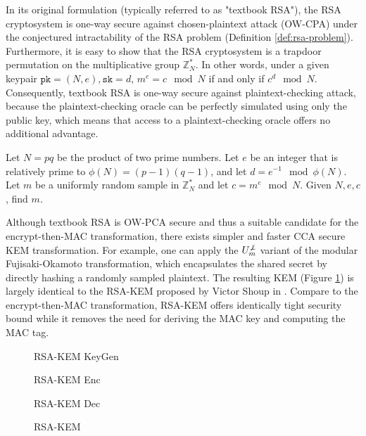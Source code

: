 \documentclass[runningheads]{llncs}
\begin{document}
In its original formulation (typically referred to as "textbook RSA"), the RSA cryptosystem is one-way secure against chosen-plaintext attack (OW-CPA) under the conjectured intractability of the RSA problem \cite{DBLP:journals/cacm/RivestSA78} (Definition \ref{def:rsa-problem}). Furthermore, it is easy to show that the RSA cryptosystem is a trapdoor permutation on the multiplicative group $\mathbb{Z}_N^\ast$. In other words, under a given keypair $\texttt{pk} = (N, e), \texttt{sk} = d$, $m^e = c \mod N$ if and only if $c^d \mod N$. Consequently, textbook RSA is one-way secure against plaintext-checking attack, because the plaintext-checking oracle can be perfectly simulated using only the public key, which means that access to a plaintext-checking oracle offers no additional advantage.

\begin{definition}\label{def:rsa-problem}
   Let $N = pq$ be the product of two prime numbers. Let $e$ be an integer that is relatively prime to $\phi(N) = (p - 1)(q - 1)$, and let $d = e^{-1} \mod \phi(N)$. Let $m$ be a uniformly random sample in $\mathbb{Z}_N^\ast$ and let $c = m^e \mod N$. Given $N, e, c$, find $m$.
\end{definition}

Although textbook RSA is OW-PCA secure and thus a suitable candidate for the encrypt-then-MAC transformation, there exists simpler and faster CCA secure KEM transformation. For example, one can apply the $U^{\not\bot}_m$ variant of the modular Fujisaki-Okamoto transformation, which encapsulates the shared secret by directly hashing a randomly sampled plaintext. The resulting KEM (Figure \ref{fig:rsa-kem}) is largely identical to the RSA-KEM proposed by Victor Shoup in \cite{DBLP:journals/iacr/Shoup01}. Compare to the encrypt-then-MAC transformation, RSA-KEM offers identically tight security bound while it removes the need for deriving the MAC key and computing the MAC tag.

\begin{figure}[H]
    \centering
    \begin{minipage}[t]{0.3\textwidth}
        \begin{algorithm}[H]
            \caption*{RSA-KEM KeyGen}
        \end{algorithm}
    \end{minipage}
    \begin{minipage}[t]{0.3\textwidth}
        \begin{algorithm}[H]
            \caption*{RSA-KEM Enc}
        \end{algorithm}
    \end{minipage}
    \begin{minipage}[t]{0.3\textwidth}
        \begin{algorithm}[H]
            \caption*{RSA-KEM Dec}
        \end{algorithm}
    \end{minipage}
    \caption{RSA-KEM}\label{fig:rsa-kem}
\end{figure}
\end{document}
